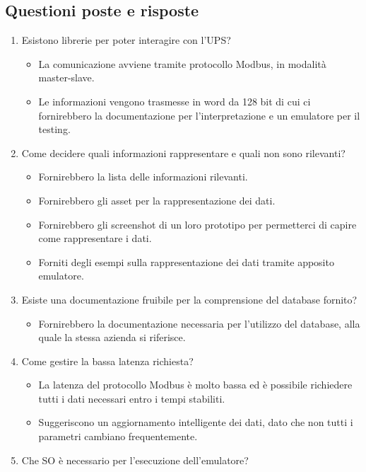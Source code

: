 \subsection{Questioni poste e risposte}
\begin{enumerate}
    \item Esistono librerie per poter interagire con l'UPS?
    \begin{itemize} 
        \item La comunicazione avviene tramite protocollo Modbus, in modalità master-slave.
        \item Le informazioni vengono trasmesse in word da 128 bit di cui ci fornirebbero la documentazione per l'interpretazione e un emulatore per il testing.
    \end{itemize}
    \item Come decidere quali informazioni rappresentare e quali non sono rilevanti?
    \begin{itemize}
        \item Fornirebbero la lista delle informazioni rilevanti.
        \item Fornirebbero gli asset per la rappresentazione dei dati.
        \item Fornirebbero gli screenshot di un loro prototipo per permetterci di capire come rappresentare i dati.
        \item Forniti degli esempi sulla rappresentazione dei dati tramite apposito emulatore.
    \end{itemize}
    \item Esiste una documentazione fruibile per la comprensione del database fornito?
    \begin{itemize}
        \item Fornirebbero la documentazione necessaria per l'utilizzo del database, alla quale la stessa azienda si riferisce.
    \end{itemize}
    \item Come gestire la bassa latenza richiesta?
    \begin{itemize}
        \item La latenza del protocollo Modbus è molto bassa ed è possibile richiedere tutti i dati necessari entro i tempi stabiliti.
        \item Suggeriscono un aggiornamento intelligente dei dati, dato che non tutti i parametri cambiano frequentemente.
    \end{itemize}
    \item Che SO è necessario per l'esecuzione dell'emulatore?

\end{enumerate}
